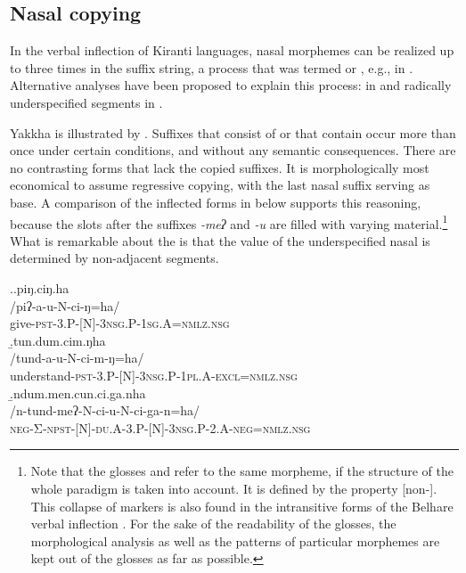 \subsection{Nasal copying}\label{sec-nasalcop}

In the verbal inflection of Kiranti languages, nasal morphemes can be realized up to three times in the suffix string, a process that was termed  or , e.g., in \citet{Driem1987A-grammar, Doornenbal2009A-grammar, Ebert2003Kiranti, Bickel2003Belhare}. Alternative analyses have been proposed to explain this process:  in \citet{Bickeletal2007Free} and radically underspecified segments  in \citet{Zimmermann2012_Affix}. 

Yakkha  is illustrated by \Next. Suffixes that consist of  or that contain  occur more than once under certain conditions, and without any semantic consequences. There are no contrasting forms that lack the copied suffixes. It is  morphologically most economical to assume regressive copying, with the last nasal suffix serving as base. A comparison of the inflected forms in \Next below supports this reasoning, because the slots after the suffixes \emph{-meʔ} and \emph{-u} are filled with varying material.\footnote{Note that the glosses  and  refer to the same morpheme, if the structure of the whole paradigm is taken into account. It is defined by the property [non-]. This collapse of markers is also found  in the intransitive forms of the Belhare verbal inflection \citep{Bickel1995In-the-vestibule}. For the sake of the readability of the glosses, the morphological analysis as well as the  patterns of particular morphemes are kept out of the glosses as far as possible.} What is remarkable about the  is that the value of the underspecified nasal is determined by non-adjacent segments.


\ex.\a.\glll piŋ.ciŋ.ha\\
		/piʔ-a-u-N-ci-ŋ=ha/\\
		give\textsc{-pst-3.P-[N]-3nsg.P-1sg.A=nmlz.nsg}\\
 	\b.\glll tun.dum.cim.ŋha\\
	/tund-a-u-N-ci-m-ŋ=ha/\\
	understand\textsc{-pst-3.P-[N]-3nsg.P-1pl.A-excl=nmlz.nsg}		\\
	\b.\glll ndum.men.cun.ci.ga.nha\\
	/n-tund-meʔ-N-ci-u-N-ci-ga-n=ha/\\
	\textsc{neg-}Σ\textsc{-npst-[N]-du.A-3.P-[N]-3nsg.P-2.A-neg=nmlz.nsg}\\

